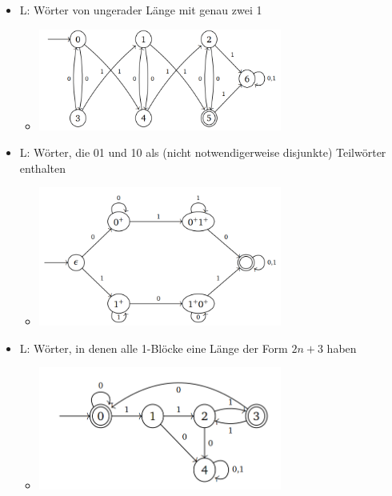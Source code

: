 \documentclass[11pt,a4paper]{article}
\begin{document}
\begin{itemize}
\item L: Wörter von ungerader Länge mit genau zwei 1
	\begin{itemize}
	\item[]
		\begin{center}
		\includegraphics[width=8cm]{auto4}
		\end{center}	
	\end{itemize}
	
\item L: Wörter, die 01 und 10 als (nicht notwendigerweise disjunkte) Teilwörter enthalten
	\begin{itemize}
	\item[]
		\begin{center}
		\includegraphics[width=8cm]{auto5}
		\end{center}	
	\end{itemize}

\item L: Wörter, in denen alle 1-Blöcke eine Länge der Form $2n+3$ haben
	\begin{itemize}
	\item[]
		\begin{center}
		\includegraphics[width=8cm]{auto6}
		\end{center}	
	\end{itemize}
	

\end{itemize}
\end{document}
